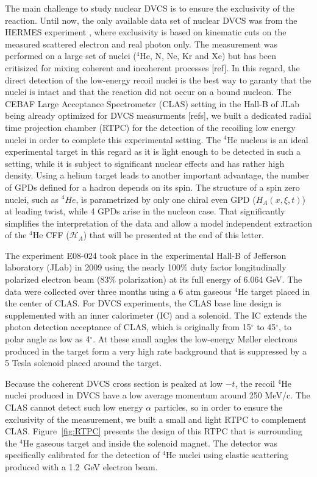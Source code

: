 \documentclass[nofootinbib,twocolumn,showpacs,prl,superscriptaddress,secnumarabic,amssymb,nobibnotes,aps,floatfix]{revtex4}
\begin{document}
The main challenge to study nuclear DVCS is to ensure the exclusivity of the 
reaction. Until now, the only available data set of nuclear DVCS
was from the HERMES experiment \cite{Ellinghaus:2002zw}, where exclusivity is 
based on kinematic cuts on the measured scattered electron and real photon only. 
The measurement was performed on a large set of nuclei ($^4$He, N, Ne, Kr and 
Xe) but has been critisized for mixing coherent and incoherent processes 
[ref]. In this regard, the direct detection of the low-energy recoil nuclei is the best way to
garanty that the nuclei is intact and that the reaction did not occur on a 
bound nucleon. The CEBAF Large Acceptance Spectrometer (CLAS) setting  in the
Hall-B of JLab being already optimized for DVCS measurments 
[refs], we built a dedicated radial time projection chamber (RTPC) for 
the detection of the recoiling low energy nuclei in order to complete this
experimental setting. The $^4$He nucleus is an ideal experimental target in
this regard as it is light enough to be detected in such a setting, while it
is subject to significant nuclear effects \cite{JSeely} and has rather high 
density. Using a helium target leads to another important advantage, the number of GPDs 
defined for a hadron depends on its spin. The structure of a spin zero nuclei, such as 
$^4He$, is parametrized by only one chiral even GPD ($H_{A}(x,\xi,t)$) at 
leading twist, while 4 GPDs arise in the nucleon case. That significantly
simplifies the interpretation of the data and allow a model independent
extraction of the $^4$He CFF ($\mathcal{H}_{A}$) that will be presented at the
end of this letter. 


The experiment E08-024 took place in the experimental Hall-B of Jefferson 
laboratory (JLab) in 2009 using the nearly 100\% duty factor longitudinally 
polarized electron beam (83$\%$ polarization) at its full energy of 6.064 
GeV. The data were collected over three months using a 6 atm gaseous $^4$He 
target placed in the center of CLAS. For DVCS experiments, the CLAS base line 
design \cite{CLAS_ref} is supplemented with an inner calorimeter (IC) and a
solenoid. The IC extends the photon detection acceptance of CLAS, which is 
originally from 15$^{\circ}$ to 45$^{\circ}$, to polar angle as low 
as 4$^{\circ}$. At these small angles the low-energy M\o{}ller 
electrons produced in the target form a very high rate background that is
suppressed by a 5 Tesla solenoid placed around the target. 

Because the coherent DVCS cross section is peaked at low $-t$, the recoil 
$^4$He nuclei produced in DVCS have a low average momentum around 250 MeV/c.
The CLAS cannot detect such low energy $\alpha$ particles, so in order to 
ensure the exclusivity of the measurement, we 
built a small and light RTPC to complement CLAS. Figure~\ref{fig:RTPC} presents 
the design of this RTPC that is surrounding the 
$^4$He gaseous target and inside the solenoid magnet.
The detector was specifically calibrated for the detection of
$^4$He nuclei using elastic scattering produced with a 1.2~GeV electron beam.
\end{document}
